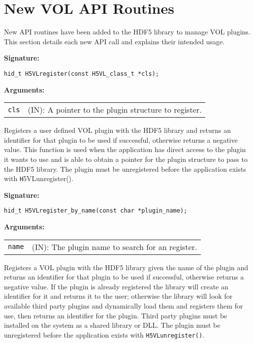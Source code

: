 \section{New VOL API Routines}
\label{sec:api}
New API routines have been added to the HDF5 library to manage VOL plugins. This section details each new API call and explains their intended usage.

\begin{mdframed}[style=bgbox]
\textbf{Signature:}
\begin{lstlisting}
hid_t H5VLregister(const H5VL_class_t *cls);
\end{lstlisting}

\textbf{Arguments:}\\
\begin{tabular}{l p{10cm}}
  {\tt cls} & (IN): A pointer to the plugin structure to register.\\
\end{tabular}
\end{mdframed}

Registers a user defined VOL plugin with the HDF5 library and returns an identifier for that plugin to be used if successful, otherwise returns a negative value. This function is used when the application has direct access to the plugin it wants to use and is able to obtain a pointer for the plugin structure to pass to the HDF5 library. The plugin must be unregistered before the application exists with {\texttt H5VLunregister()}.\bigskip


\begin{mdframed}[style=bgbox]
\textbf{Signature:}
\begin{lstlisting}
hid_t H5VLregister_by_name(const char *plugin_name);
\end{lstlisting}
\textbf{Arguments:}\\
\begin{tabular}{l p{10cm}}
  {\tt name} & (IN): The plugin name to search for an register.\\
\end{tabular}
\end{mdframed}
Registers a VOL plugin with the HDF5 library given the name of the plugin and returns an identifier for that plugin to be used if successful, otherwise returns a negative value. If the plugin is already registered the library will create an identifier for it and returns it to the user; otherwise the library will look for available third party plugins and dynamically load them and registers them for use, then returns an identifier for the plugin. Third party plugins must be installed on the system as a shared library or DLL. The plugin must be unregistered before the application exists with {\tt H5VLunregister()}.\bigskip

